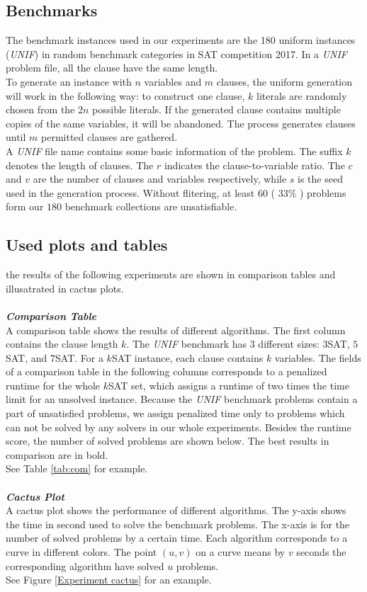 \documentclass[12pt,a4paper,twoside]{scrartcl}
\numberwithin{equation}{section}
\begin{document}
\subsection{Benchmarks}
\label{benchmark}
The benchmark instances used in our experiments are the 180 uniform instances (\emph{UNIF}) in random benchmark categories in SAT competition 2017\cite{balyo2017proceedings}. In a \emph{UNIF} problem file, all the clause have the same length.\\
To generate an instance with $n$ variables and $m$ clauses, the uniform generation will work in the following way: to construct one clause, $k$ literals are randomly chosen from the $2n$ possible literals. If the generated clause contains multiple copies of the same variables, it will be abandoned. The process generates clauses until $m$ permitted clauses are gathered.\\
A \emph{UNIF} file name contains some basic information of the problem. The suffix $k$  denotes the length of clauses. The $r$ indicates the clause-to-variable ratio. The $c$ and $v$ are the number of clauses and variables respectively, while $s$ is the seed used in the generation process.
Without flitering, at least $60$ ( $33\%$ ) problems form our $180$ benchmark collections are unsatisfiable.
\clearpage
\subsection{Used plots and tables}
the results of the following experiments are shown in comparison tables and  illusatrated in cactus plots.  \\
\\
\emph{\textbf{Comparison Table}}\\
A comparison table shows the results of different algorithms. The first column contains the
clause length $k$. The  \emph{UNIF} benchmark has $3$ different sizes: $3$SAT, $5$SAT, and $7$SAT. For a $k$SAT instance, each clause contains $k$ variables. The fields of a comparison table in the following columns corresponds to a penalized runtime for the whole $k$SAT set, which assigns a runtime of two times the time limit for an unsolved instance. Because the  \emph{UNIF} benchmark problems contain a part of unsatisfied problems, we assign penalized time only to problems which can not be solved by any solvers in our whole experiments. Besides the runtime score, the number of solved problems are shown below. The best results in comparison are in bold.
\\
See Table \ref{tab:com} for example.\\
\\
\emph{\textbf{Cactus Plot}}\\
A cactus plot shows the performance of different algorithms. The y-axis shows the time in second used to solve the benchmark problems.  The x-axis is for the number of solved problems by a certain time. Each algorithm corresponds to a curve in different colors. The point $(u, v)$ on a curve means by $v$ seconds the corresponding algorithm have solved  $u$ problems.  \\
See Figure \ref{Experiment cactus} for an example.\\
\end{document}
